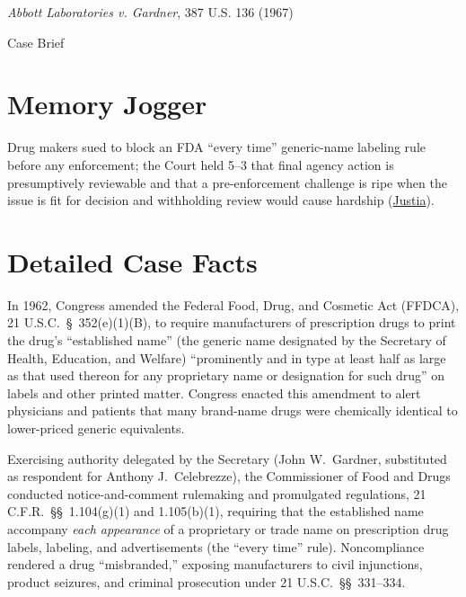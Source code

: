 \documentclass[12pt]{article}
\begin{document}
\begin{center}
{\LARGE \textit{Abbott Laboratories v. Gardner}, 387 U.S. 136 (1967)\par}
\vspace{0.8em}
{\large Case Brief\par}
\end{center}
\vspace{1em}

\section{Memory Jogger}
Drug makers sued to block an FDA ``every time'' generic-name labeling rule before any enforcement; the Court held 5--3 that final agency action is presumptively reviewable and that a pre-enforcement challenge is ripe when the issue is fit for decision and withholding review would cause hardship (\href{https://supreme.justia.com/cases/federal/us/387/136/}{Justia}).

\section{Detailed Case Facts}
In 1962, Congress amended the Federal Food, Drug, and Cosmetic Act (FFDCA), 21 U.S.C.\ \S~352(e)(1)(B), to require manufacturers of prescription drugs to print the drug's ``established name'' (the generic name designated by the Secretary of Health, Education, and Welfare) ``prominently and in type at least half as large as that used thereon for any proprietary name or designation for such drug'' on labels and other printed matter. Congress enacted this amendment to alert physicians and patients that many brand-name drugs were chemically identical to lower-priced generic equivalents.

Exercising authority delegated by the Secretary (John W.\ Gardner, substituted as respondent for Anthony J.\ Celebrezze), the Commissioner of Food and Drugs conducted notice-and-comment rulemaking and promulgated regulations, 21 C.F.R.\ \S\S~1.104(g)(1) and 1.105(b)(1), requiring that the established name accompany \emph{each appearance} of a proprietary or trade name on prescription drug labels, labeling, and advertisements (the ``every time'' rule). Noncompliance rendered a drug ``misbranded,'' exposing manufacturers to civil injunctions, product seizures, and criminal prosecution under 21 U.S.C.\ \S\S~331--334.
\end{document}
